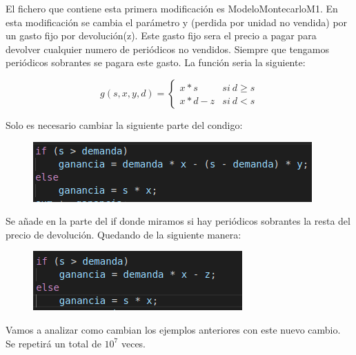 \documentclass[]{article}
\begin{document}
El fichero que contiene esta primera modificación es ModeloMontecarloM1. En esta modificación se cambia el parámetro y (perdida por unidad no vendida) por un gasto fijo por devolución(z). Este gasto fijo sera el precio a pagar para devolver cualquier numero de periódicos no vendidos. Siempre que tengamos periódicos sobrantes se pagara este gasto. La función seria la siguiente:



$$
g(s, x, y, d)=\left\{\begin{array}{ll}{x * s} & { { si\ } d \geq s} \\ {x * d-z} & { { si \ } d<s}\end{array}\right.
$$

Solo es necesario cambiar la siguiente parte del condigo:
\begin{figure}[H]
	\centering
	\includegraphics[width=1\linewidth]{img/screenshot003}
\end{figure}

Se añade en la parte del if donde miramos si hay periódicos sobrantes la resta del precio de devolución. Quedando de la siguiente manera:

\begin{figure}[H]
	\centering
	\includegraphics[width=1\linewidth]{img/screenshot005}
	\label{fig:screenshot005}
\end{figure}
\newpage
Vamos a analizar como cambian los ejemplos anteriores con este nuevo cambio. Se repetirá un total de $10^{7}$ veces.
\end{document}
